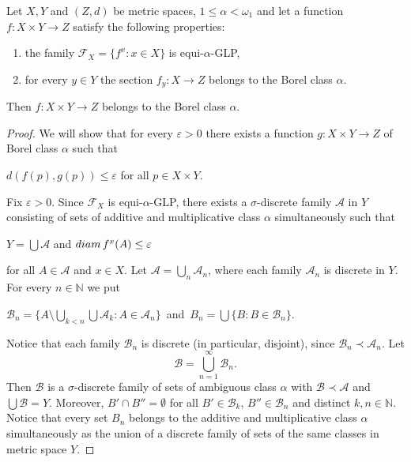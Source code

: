 \documentclass[10pt,a4paper]{amsart}
\begin{document}
 \begin{theorem}
 Let $X, Y$ and $(Z,d)$ be metric spaces, $1\le\alpha<\omega_1$ and let a function $f\colon X\times Y\to Z$ satisfy the following properties:
 \begin{enumerate}
 	\item the family $\mathscr F_X=\{f^x: x\in X\}$ is equi-$\alpha$-GLP,
 	
 	\item for every $y\in Y$ the section $f_y\colon X\to Z$ belongs to the Borel class $\alpha$. 
 \end{enumerate}
 
 Then $f\colon X\times Y\to Z$ belongs to the  Borel class $\alpha$.
\end{theorem}

\begin{proof} We will show that for every $\varepsilon>0$ there exists a function $g\colon X\times Y\to Z$ of Borel class $\alpha$ such that
	\begin{center}
		 $d(f(p),g(p))\le\varepsilon$ for all $p\in X\times Y$.
	\end{center} 
	Fix $\varepsilon>0$. Since $\mathscr F_X$ is equi-$\alpha$-GLP, there exists a $\sigma$-discrete family $\mathcal A$ in $Y$ consisting of sets of additive and multiplicative class $\alpha$ simultaneously such that
	\begin{center}
		  $Y=\bigcup \mathcal A$ \quad and \quad ${\rm diam}\,f^x(A)\le\varepsilon$
	\end{center} 
	for all $A\in\mathcal A$ and $x\in X$. Let $\mathcal A=\bigcup\limits_n\mathcal A_n$, where each family $\mathcal A_n$ is discrete in $Y$. For every $n\in\mathbb N$ we put 
	\begin{center}
		 	$\mathcal B_n=\{ A\setminus \bigcup\limits_{k<n}\bigcup \mathcal A_k: A\in\mathcal A_n\}$\,\,\,and\,\,\,$B_n=\bigcup\{B:B\in\mathcal B_n\}$.
	\end{center}
    Notice that each family $\mathcal B_n$ is discrete (in particular, disjoint), since $\mathcal B_n\prec\mathcal A_n$.  Let 
      $$
      \mathcal B=\bigcup\limits_{n=1}^\infty \mathcal B_n.
      $$
 	Then $\mathcal B$ is a  $\sigma$-discrete family of sets of ambiguous class $\alpha$ with $\mathcal B\prec \mathcal A$ and $\bigcup\mathcal B=Y$. Moreover, $B'\cap B''=\emptyset$ for all $B'\in\mathcal B_k$, $B''\in\mathcal B_n$ and distinct $k,n\in\mathbb N$. Notice that every set $B_n$ belongs to the additive and multiplicative class $\alpha$ simultaneously as the union of a discrete family of sets of the same classes in metric space $Y$. 
	

\end{proof}
\end{document}
